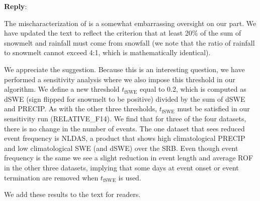 \documentclass{article}
\newcommand{\reply}{\vspace{0.25cm} \textbf{Reply}:\ }
\begin{document}
\reply{
The mischaracterization of \citet{freudiger2014large} is a somewhat embarrassing oversight on our part. We have updated the text to reflect the criterion that at least 20\% of the sum of snowmelt and rainfall must come from snowfall (we note that the ratio of rainfall to snowmelt cannot exceed 4:1, which is mathematically identical).

We appreciate the suggestion. Because this is an interesting question, we have performed a sensitivity analysis where we also impose this threshold in our algorithm. We define a new threshold $t_{\textrm{fSWE}}$ equal to 0.2, which is computed as dSWE (sign flipped for snowmelt to be positive) divided by the sum of dSWE and PRECIP. As with the other three thresholds, $t_{\textrm{fSWE}}$ must be satisfied in our sensitivity run (RELATIVE\_F14). We find that for three of the four datasets, there is no change in the number of events. The one dataset that sees reduced event frequency is NLDAS, a product that shows high climatological PRECIP and low climatological SWE (and dSWE) over the SRB. Even though event frequency is the same we see a slight reduction in event length and average ROF in the other three datasets, implying that some days at event onset or event termination are removed when $t_{\textrm{fSWE}}$ is used.

We add these results to the text for readers.

}
\end{document}
